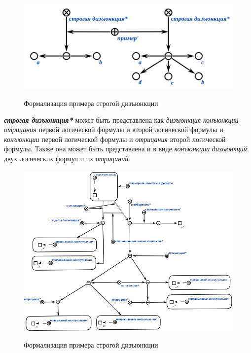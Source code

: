 \begin{figure}[H]
	\caption{Формализация примера строгой дизъюнкции}
	\includegraphics[scale=0.8]{author/part2/figures/logic/strictDisjunction.png}
	\label{fig:strict_disjunction}
\end{figure}

\textbf{\textit{строгая дизъюнкция*}} может быть представлена как \textit{дизъюнкция} \textit{конъюнкции} \textit{отрицания} первой логической формулы и второй логической формулы и \textit{конъюнкции} первой логической формулы и \textit{отрицания} второй логической формулы. Также она может быть представлена и в виде \textit{конъюнкции} \textit{дизъюнкций} двух логических формул и их \textit{отрицаний}.

\begin{figure}[H]
	\caption{Формализация примера строгой дизъюнкции}
	\includegraphics[scale=0.8]{author/part2/figures/logic/strict_disjunction_representation.png}
	\label{fig:strict_disjunction_representation}
\end{figure}

\begin{SCn}
\end{SCn}

